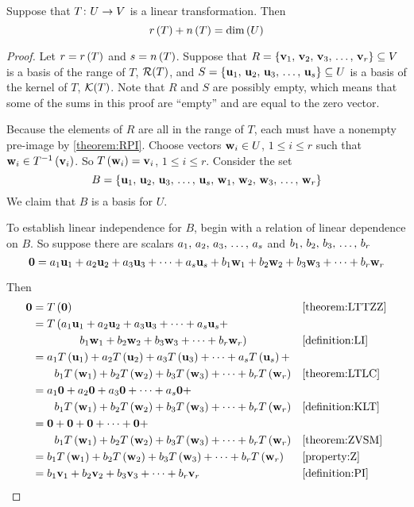 \documentclass{ximera}
\begin{document}
\begin{theorem}
\label{theorem:RPNDD}


Suppose that $T\colon U\rightarrow V$ is a linear transformation.  Then
\[
r\left(T\right)+n\left(T\right)=\dim\left(U\right)
\]






\begin{proof}
Let $r=r\left(T\right)$ and $s=n\left(T\right)$.  Suppose that $R=\left\{\mathbf{v}_{1},\,\mathbf{v}_{2},\,\mathbf{v}_{3},\,\ldots,\,\mathbf{v}_{r}\right\}\subseteq V$ is a basis of the range of $T$, $\mathcal{R}\!\left(T\right)$, and $S=\left\{\mathbf{u}_{1},\,\mathbf{u}_{2},\,\mathbf{u}_{3},\,\ldots,\,\mathbf{u}_{s}\right\}\subseteq U$ is a basis of the kernel of $T$, $\mathcal{K}\!\left(T\right)$.  Note that $R$ and $S$ are possibly empty, which means that some of the sums in this proof are ``empty'' and are equal to the zero vector.



Because the elements of $R$ are all in the range of $T$, each must have a nonempty pre-image by \ref{theorem:RPI}.  Choose vectors $\mathbf{w}_i\in U$, $1\leq i\leq r$ such that $\mathbf{w}_i\in T^{-1}\left(\mathbf{v}_i\right)$.  So $T\left(\mathbf{w}_i\right)=\mathbf{v}_i$, $1\leq i\leq r$.  Consider the set
\[
B=\left\{\mathbf{u}_{1},\,\mathbf{u}_{2},\,\mathbf{u}_{3},\,\ldots,\,\mathbf{u}_{s},\,\mathbf{w}_{1},\,\mathbf{w}_{2},\,\mathbf{w}_{3},\,\ldots,\,\mathbf{w}_{r}\right\}
\]
We claim that $B$ is a basis for $U$.



To establish linear independence for $B$, begin with a relation of linear dependence on $B$.  So suppose there are scalars ${a}_{1},\,{a}_{2},\,{a}_{3},\,\ldots,\,{a}_{s}$ and ${b}_{1},\,{b}_{2},\,{b}_{3},\,\ldots,\,{b}_{r}$
\[
\mathbf{0}=a_{1}\mathbf{u}_{1}+a_{2}\mathbf{u}_{2}+a_{3}\mathbf{u}_{3}+\cdots +a_{s}\mathbf{u}_{s}+b_{1}\mathbf{w}_{1}+b_{2}\mathbf{w}_{2}+b_{3}\mathbf{w}_{3}+\cdots +b_{r}\mathbf{w}_{r}
\]




Then
\begin{align*}
\mathbf{0}&=T\left(\mathbf{0}\right)&&\ref{theorem:LTTZZ}\\
&=T\left(a_{1}\mathbf{u}_{1}+a_{2}\mathbf{u}_{2}+a_{3}\mathbf{u}_{3}+\cdots +a_{s}\mathbf{u}_{s}+\right.\\
&\quad\quad\quad\quad\left.b_{1}\mathbf{w}_{1}+b_{2}\mathbf{w}_{2}+b_{3}\mathbf{w}_{3}+\cdots +b_{r}\mathbf{w}_{r}\right)&&\ref{definition:LI}\\
&=a_1T\left(\mathbf{u}_1\right)+a_2T\left(\mathbf{u}_2\right)+a_3T\left(\mathbf{u}_3\right)+\cdots+a_sT\left(\mathbf{u}_s\right)+\\
&\quad\quad b_1T\left(\mathbf{w}_1\right)+b_2T\left(\mathbf{w}_2\right)+b_3T\left(\mathbf{w}_3\right)+\cdots+b_rT\left(\mathbf{w}_r\right)
&&\ref{theorem:LTLC}\\
&=a_1\mathbf{0}+a_2\mathbf{0}+a_3\mathbf{0}+\cdots+a_s\mathbf{0}+\\
&\quad\quad b_1T\left(\mathbf{w}_1\right)+b_2T\left(\mathbf{w}_2\right)+b_3T\left(\mathbf{w}_3\right)+\cdots+b_rT\left(\mathbf{w}_r\right)
&&\ref{definition:KLT}\\
&=\mathbf{0}+\mathbf{0}+\mathbf{0}+\cdots+\mathbf{0}+\\
&\quad\quad b_1T\left(\mathbf{w}_1\right)+b_2T\left(\mathbf{w}_2\right)+b_3T\left(\mathbf{w}_3\right)+\cdots+b_rT\left(\mathbf{w}_r\right)
&&\ref{theorem:ZVSM}\\
&=b_1T\left(\mathbf{w}_1\right)+b_2T\left(\mathbf{w}_2\right)+b_3T\left(\mathbf{w}_3\right)+\cdots+b_rT\left(\mathbf{w}_r\right)&&\ref{property:Z}\\
&=b_1\mathbf{v}_1+b_2\mathbf{v}_2+b_3\mathbf{v}_3+\cdots+b_r\mathbf{v}_r&&\ref{definition:PI}
\end{align*}





\end{proof}
\end{theorem}
\end{document}
